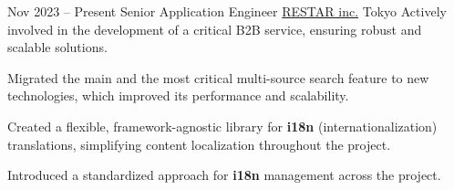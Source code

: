 \cventry
{Nov 2023 – Present}
{Senior Application Engineer}
{\href{https://www.restar-inc.com/}{RESTAR inc.}}
{Tokyo}
{}
{Actively involved in the development of a critical B2B service, ensuring robust and scalable solutions.}

\cvlistitem
{Migrated the main and the most critical multi-source search feature to new technologies, which improved its performance and scalability.}

\cvlistitem
{Created a flexible, framework-agnostic library for \textbf{i18n} (internationalization) translations, simplifying content localization throughout the project.}

\cvlistitem
{Introduced a standardized approach for \textbf{i18n} management across the project.}
